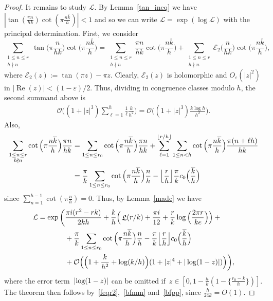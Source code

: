 \documentclass[11pt]{amsart}
\newcommand{\eps}{\varepsilon}
\newcommand{\E}{\mathcal{E}}
\theoremstyle{definition}
\newcommand{\ssum}[1]{\sum_{\substack{#1}}}
\newcommand{\floor}[1]{{\left\lfloor {#1} \right\rfloor}}
\newcommand{\Oh}{\mathcal{O}}
\DeclareMathOperator{\Lie}{{\mathfrak L}}
\renewcommand\Re{\operatorname{Re}}
\newcommand{\1}{{\mathbf 1}}
\newcommand{\abs}[1]{\left|#1\right|}
\let\originalleft\left
\let\originalright\right
\renewcommand{\left}{\mathopen{}\mathclose\bgroup\originalleft}
\renewcommand{\right}{\aftergroup\egroup\originalright}
\numberwithin{equation}{section}
\begin{document}
\begin{proof}
  It remains to study $\mathcal{L}$. By Lemma~\ref{tan_ineq} we have $|\tan( \frac{\pi n}{hk})\cot(\pi \frac{n\overline k}h)|<1$ and so we can write $\mathcal{L}=\exp(\log \mathcal{L})$ with the principal determination. First, we consider
  \begin{equation*}
    \ssum{1\leq n\leq r\\ h\nmid n}\tan\Big(\pi\frac n{hk}\Big)\cot\Big(\pi\frac{n\overline k }h\Big)=\ssum{1\leq n\leq r\\ h\nmid n}\frac {\pi n}{hk}\cot\Big(\pi\frac{n\overline k }h\Big)+\ssum{1\leq n\leq r\\ h\nmid n}\E_2\Big(\frac n{hk}\Big)\cot\Big(\pi\frac{n\overline k }h\Big),
  \end{equation*}
  where $\E_2(z):=\tan(\pi z)-\pi z$. Clearly, $\E_2(z)$ is holomorphic and $O_\eps(|z|^2)$ in $|\Re(z)|<(1-\eps)/2$. Thus, dividing in congruence classes modulo $h$, the second summand above is
  \begin{align*}
    \Oh\Big((1+|z|^3)\sum_{\ell=1}^h\frac 1\ell\frac k{h^2}\Big) = \Oh\Big((1+|z|^3)\frac {k\log h}{h^2}\Big).
  \end{align*}
  Also,
  \begin{align*}
    \ssum{1\leq n\leq r\\ h\nmid n}\cot\Big(\pi\frac{n\overline k }h\Big)\frac{\pi n}{hk}&=\ssum{1\leq n\leq r_0}\cot\Big(\pi\frac{n\overline k }h\Big)\frac{\pi n}{hk}+\sum_{\ell=1}^{\floor{r/h}}\ssum{1\leq n<h}\cot\Big(\pi\frac{n\overline k }h\Big)\frac{\pi (n+\ell h)}{hk}\\
    &=\frac{\pi }k\ssum{1\leq n\leq r_0}\cot\Big(\pi\frac{n\overline k }h\Big)\frac{ n}{h}-\floor{\frac rh}\frac {\pi}kc_0\Big(\frac{\overline k}h\Big)
  \end{align*}
  since $\sum_{n=1}^{h-1}\cot(\pi\frac{n}h)=0$. Thus, by Lemma~\ref{madc} we have 
  \begin{align*}
    \mathcal{L}=\exp\bigg(&\frac{\pi i (r^2-rk)}{2kh}+\frac kh\Big(\Lie(r/k)+\frac{\pi i }{12}+\frac rk \log\Big( \frac {2 \pi r}{ke}\Big)\Big)+{}\\
    &+\frac{\pi }k\ssum{1\leq n\leq r_0}\cot\Big(\pi\frac{n\overline k }h\Big)\frac{ n}{h}    -\frac {\pi}k\floor{\frac rh}c_0\Big(\frac{\overline k}h\Big) \\
    & +\Oh\Big(\Big(1+\frac{k}{h^2}+\log(k/h)\Big)(1+|z|^4+|\log(1-z)|)\Big)\bigg),
  \end{align*}
  where the error term~$\abs{\log(1-z)}$ can be omitted if~$z\in[0,1 - \frac{h}k(1-\{\frac{r_0-k}h\})]$.
  The theorem then follows by~\eqref{feqr2},~\eqref{bfmm} and~\eqref{bfpp}, since $\frac{ h}{24k}=O(1).$
\end{proof}
\end{document}
